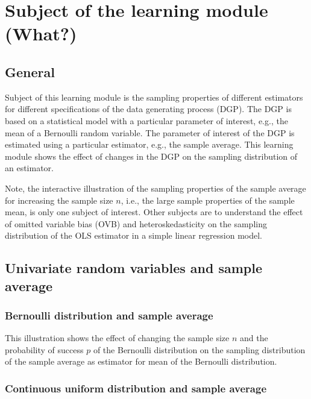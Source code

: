 \documentclass{article}
\begin{document}
\section{Subject of the learning module (What?)}

\subsection{General}

Subject of this learning module is the sampling properties of different estimators for different specifications of the data generating process (DGP). 
%
The DGP is based on a statistical model with a particular parameter of interest, e.g., the mean of a Bernoulli random variable. 
%
The parameter of interest of the DGP is estimated using a particular estimator, e.g., the sample average. 
%
This learning module shows the effect of changes in the DGP on the sampling distribution of an estimator.  

Note, the interactive illustration of the sampling properties of the sample average for increasing the sample size $n$, i.e., the large sample properties of the sample mean, is only one subject of interest. 
%
Other subjects are to understand the effect of omitted variable bias (OVB) and heteroskedasticity on the sampling distribution of the OLS estimator in a simple linear regression model.


\subsection{Univariate random variables and sample average}

\subsubsection{Bernoulli distribution and sample average}


This illustration shows the effect of changing the sample size $n$ and the probability of success $p$ of the Bernoulli distribution on the sampling distribution of the sample average as estimator for mean of the Bernoulli distribution.

\subsubsection{Continuous uniform distribution and sample average}
\end{document}

